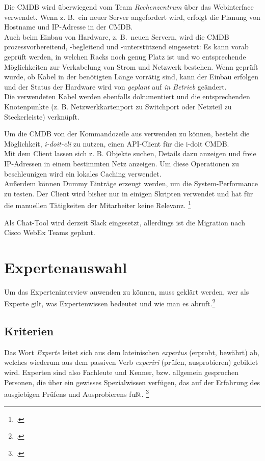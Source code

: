 Die \acs{CMDB} wird überwiegend vom Team \textit{Rechenzentrum} über das Webinterface verwendet. Wenn z. B.~ein neuer Server angefordert wird, erfolgt die Planung von Hostname und IP-Adresse in der \acs{CMDB}.\\
Auch beim Einbau von Hardware, z. B.~neuen Servern, wird die \acs{CMDB} prozessvorbereitend, -begleitend und -unterstützend eingesetzt: Es kann vorab geprüft werden, in welchen Racks noch genug Platz ist und wo entsprechende Möglichkeiten zur Verkabelung von Strom und Netzwerk bestehen. Wenn geprüft wurde, ob Kabel in der benötigten Länge vorrätig sind, kann der Einbau erfolgen und der Status der Hardware wird von \textit{geplant} auf \textit{in Betrieb} geändert.\\
Die verwendeten Kabel werden ebenfalls dokumentiert und die entsprechenden Knotenpunkte (z. B. Netzwerkkartenport zu Switchport oder Netzteil zu Steckerleiste) verknüpft.

Um die \acs{CMDB} von der Kommandozeile aus verwenden zu können, besteht die Möglichkeit, \textit{i-doit-cli} zu nutzen, einen \acf{API}-Client für die i-doit \acs{CMDB}.\\
Mit dem Client lassen sich z. B. Objekte suchen, Details dazu anzeigen und freie IP-Adressen in einem bestimmten Netz anzeigen. Um diese Operationen zu beschleunigen wird ein lokales Caching verwendet.\\
Außerdem können Dummy Einträge erzeugt werden, um die System-Performance zu testen. Der Client wird bisher nur in einigen Skripten verwendet und hat für die manuellen Tätigkeiten der Mitarbeiter keine Relevanz.
\footcite[Vgl.][o. \pno]{Heisig_2019_idoitcli}

Als Chat-Tool wird derzeit Slack eingesetzt, allerdings ist die Migration nach Cisco WebEx Teams geplant. 


\section{Expertenauswahl}
Um das Experteninterview anwenden zu können, muss geklärt werden, wer als Experte gilt, was Expertenwissen bedeutet und wie man es abruft.\footcite[Vgl.][6\psq]{Bogner_2014_Interview}

\subsection{Kriterien}
Das Wort \textit{Experte} leitet sich aus dem lateinischen \textit{expertus} (erprobt, bewährt) ab, welches wiederum aus dem passiven Verb \textit{experiri} (prüfen, ausprobieren) gebildet wird. Experten sind also Fachleute und Kenner, bzw. allgemein gesprochen Personen, die über ein gewisses Spezialwissen verfügen, das auf der Erfahrung des ausgiebigen Prüfens und Ausprobierens fußt. \footcite[Vgl.][9]{Bogner_2014_Interview}

